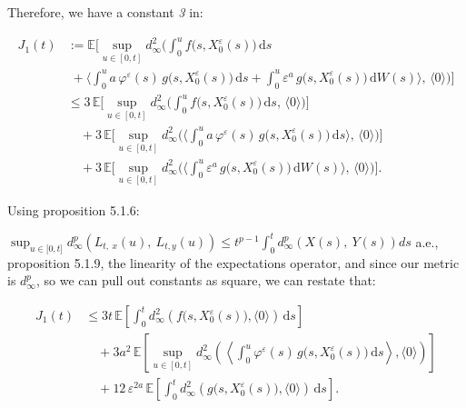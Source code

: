 \documentclass[12pt,a4paper]{report}
\numberwithin{equation}{section}
\begin{document}
Therefore, we have a constant \emph{3} in:

\begin{equation}\tag{5.1.11}\label{eq:5.1.11}
\begin{aligned}
J_{1}(t)
&:= \mathbb{E}\Biggl[\sup_{u\in[0,t]}
d_{\infty}^{2}\Biggl(
\int_{0}^{u} f\bigl(s,X_{0}^{\varepsilon}(s)\bigr)\,\mathrm{d}s \\[-2pt]
&\;+\Biggl\langle
\int_{0}^{u} a\,\varphi^{\varepsilon}(s)\,g\bigl(s,X_{0}^{\varepsilon}(s)\bigr)\,\mathrm{d}s
+\int_{0}^{u}\varepsilon^{a}\,g\bigl(s,X_{0}^{\varepsilon}(s)\bigr)\,\mathrm{d}W(s)
\Biggr\rangle,\,
\langle 0\rangle
\Biggr)\Biggr] \\
&\le 3\,\mathbb{E}\Biggl[\sup_{u\in[0,t]}
d_{\infty}^{2}\Biggl(
\int_{0}^{u} f\bigl(s,X_{0}^{\varepsilon}(s)\bigr)\,\mathrm{d}s,\,
\langle 0\rangle
\Biggr)\Biggr] \\
&\quad + 3\,\mathbb{E}\Biggl[\sup_{u\in[0,t]}
d_{\infty}^{2}\Biggl(
\Biggl\langle\int_{0}^{u} a\,\varphi^{\varepsilon}(s)\,g\bigl(s,X_{0}^{\varepsilon}(s)\bigr)\,\mathrm{d}s\Biggr\rangle,\,
\langle 0\rangle
\Biggr)\Biggr] \\
&\quad + 3\,\mathbb{E}\Biggl[\sup_{u\in[0,t]}
d_{\infty}^{2}\Biggl(
\Biggl\langle\int_{0}^{u}\varepsilon^{a}\,g\bigl(s,X_{0}^{\varepsilon}(s)\bigr)\,\mathrm{d}W(s)\Biggr\rangle,\,
\langle 0\rangle
\Biggr)\Biggr].
\end{aligned}
\end{equation}




Using proposition 5.1.6:

\(\sup_{u \in \lbrack 0,t\rbrack}{d_{\infty}^{p}\left( L_{t,\ x}(u),\ L_{t,y}(u) \right) \leq t^{p - 1}\int_{0}^{t}{d_{\infty}^{p}\left( X(s),\ Y(s) \right)ds}}\) a.e.,
proposition 5.1.9, the linearity of the expectations operator, and since
our metric is \(d_{\infty}^{p}\), so we can pull out constants as
square, we can restate that:

\[
\begin{aligned}
J_{1}(t)
&\le 3t\,\mathbb{E}\!\left[\int_{0}^{t}
d_{\infty}^{2}\!\left(f\bigl(s,X_{0}^{\varepsilon}(s)\bigr),\langle 0\rangle\right)\,\mathrm{d}s\right] \\
&\quad + 3a^{2}\,\mathbb{E}\!\left[\sup_{u\in[0,t]}
d_{\infty}^{2}\!\left(
\left\langle \int_{0}^{u}\varphi^{\varepsilon}(s)\,g\bigl(s,X_{0}^{\varepsilon}(s)\bigr)\,\mathrm{d}s\right\rangle,
\langle 0\rangle\right)\right] \\
&\quad + 12\,\varepsilon^{2a}\,\mathbb{E}\!\left[\int_{0}^{t}
d_{\infty}^{2}\!\left(g\bigl(s,X_{0}^{\varepsilon}(s)\bigr),\langle 0\rangle\right)\,\mathrm{d}s\right].
\end{aligned}
\]
\end{document}
